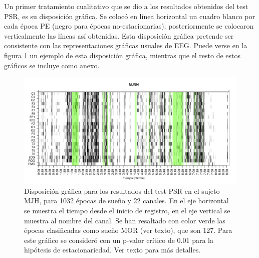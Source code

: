 Un primer tratamiento cualitativo que se dio a los resultados obtenidos del test PSR, es su
disposici\'on gr\'afica.
Se coloc\'o en l\'inea horizontal un cuadro blanco por cada
\'epoca PE (negro para \'epocas no-estacionarias);
posteriormente se colocaron verticalmente las
l\'ineas as\'i obtenidas.
Esta disposici\'on gr\'afica pretende ser consistente con las representaciones gr\'aficas
usuales de EEG.
Puede verse en la figura \ref{ejemplo1} un ejemplo de esta disposici\'on gr\'afica, mientras
que el resto de estos gr\'aficos se incluye como anexo.

\begin{figure}
\includegraphics[width=\textwidth]{MJNNVIGILOS_127_mor127_tot1032_esttotal.pdf} 
\caption{Disposici\'on gr\'afica para los resultados del test PSR en el sujeto MJH, 
para 1032 \'epocas de sue\~no y 22 canales. 
En el eje horizontal se muestra el tiempo desde el inicio de registro, en el eje vertical se muestra al 
nombre del canal. 
Se han resaltado con color verde las \'epocas clasificadas como sue\~no MOR (ver texto), que son 127.
Para este gr\'afico se consider\'o con un p-valor cr\'itico de 0.01 para la hip\'otesis
de estacionariedad. Ver texto para m\'as detalles.}
\label{ejemplo1}
\end{figure}


